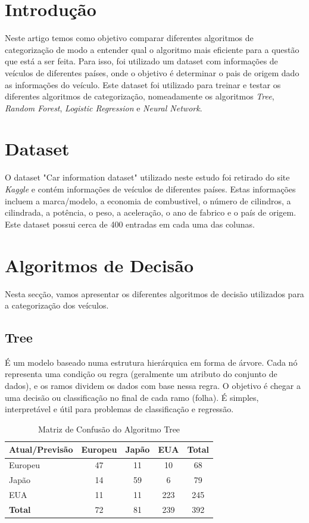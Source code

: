 \documentclass[conference]{IEEEtran}
\begin{document}
\section{Introdução}
Neste artigo temos como objetivo comparar diferentes algoritmos de categorização de modo a entender qual o algoritmo mais eficiente para
a questão que está a ser feita. Para isso, foi utilizado um dataset com informações de veículos de diferentes países, onde o objetivo é
determinar o pais de origem dado as informações do veículo. Este dataset foi utilizado para treinar e testar os diferentes algoritmos de
categorização, nomeadamente os algoritmos \textit{Tree}, \textit{Random Forest}, \textit{Logistic Regression} e \textit{Neural Network}.

\section{Dataset}
O dataset "Car information dataset" \cite{ref1} utilizado neste estudo foi retirado do site \textit{Kaggle} e contém informações de 
veículos de diferentes países. Estas informações incluem a marca/modelo, a economia de combustivel, o número de cilindros, a cilindrada, 
a potência, o peso, a aceleração, o ano de fabrico e o país de origem. Este dataset possui cerca de 400 entradas em cada uma das colunas.

\section{Algoritmos de Decisão}
Nesta secção, vamos apresentar os diferentes algoritmos de decisão utilizados para a categorização dos veículos.

\subsection{Tree}
É um modelo baseado numa estrutura hierárquica em forma de árvore. Cada nó representa uma condição ou regra 
(geralmente um atributo do conjunto de dados), e os ramos dividem os dados com base nessa regra. O objetivo 
é chegar a uma decisão ou classificação no final de cada ramo (folha). É simples, interpretável e útil para 
problemas de classificação e regressão.
\begin{table}[!ht]
    \centering
    \begin{tabular}{lcccc}
    \toprule
    \textbf{Atual/Previsão} & \textbf{Europeu} & \textbf{Japão} & \textbf{EUA} & \textbf{Total} \\
    \midrule
    Europeu & 47 & 11 & 10 & 68 \\
    Japão  & 14 & 59 & 6 & 79 \\
    EUA    & 11 & 11 & 223 & 245 \\
    \midrule
    \textbf{Total} & 72 & 81 & 239 & 392 \\
    \bottomrule
    \end{tabular}
    \label{tab:conf_matrix_tree}
    \caption{Matriz de Confusão do Algoritmo Tree}
\end{table}
\end{document}
